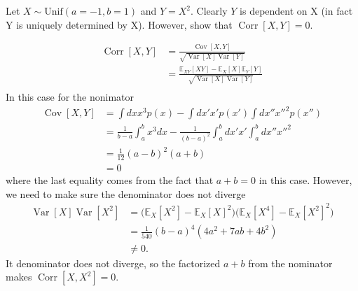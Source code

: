 \begin{example}
	Let $X\sim \text{Unif}(a=-1, b=1)$ and $Y=X^2$. Clearly $Y$ is dependent on X (in fact Y is uniquely determined by X). However, show that $\operatorname{Corr}[X,Y]=0$.
	
	\begin{equation}
		\begin{split}
			\operatorname{Corr}[X,Y] & = \frac{\operatorname{Cov}[X,Y]}{\sqrt{\operatorname{Var}[X]\operatorname{Var}[Y]}}\\
			& = \frac{\mathbb{E}_{XY}[XY]-\mathbb{E}_X[X]\mathbb{E}_Y[Y]}{\sqrt{\operatorname{Var}[X]\operatorname{Var}[Y]}}\\
		\end{split}
	\end{equation}
	In this case for the nonimator
	\begin{equation}
		\begin{split}
			\operatorname{Cov}[X,Y] &= \int dx x^3 p(x)-\int dx' x'p(x')\int dx'' x''^2p(x'')\\
			&= \frac{1}{b-a}\int_{a}^{b}x^3dx-\frac{1}{(b-a)^2}\int_{a}^{b}dx' x'\int_{a}^{b}dx'' x''^2\\
			&= \frac{1}{12}(a-b)^2(a+b)\\
			&=0
		\end{split}
	\end{equation}
	where the last equality comes from the fact that $a+b = 0$ in this case. However, we need to make sure the denominator does not diverge
	\begin{equation}
		\begin{split}
			\operatorname{Var}[X]\operatorname{Var}[X^2] & =\big(\mathbb{E}_X[X^2]-\mathbb{E}_X[X]^2\big) \big(\mathbb{E}_X[X^4]-\mathbb{E}_X[X^2]^2\big)\\
			& = \frac{1}{540}(b-a)^4(4a^2+7ab+4b^2)\\
			&\neq 0.
		\end{split}
	\end{equation}
	It denominator does not diverge, so the factorized $a+b$ from the nominator makes $\operatorname{Corr}[X,X^2]=0$.
\end{example}

